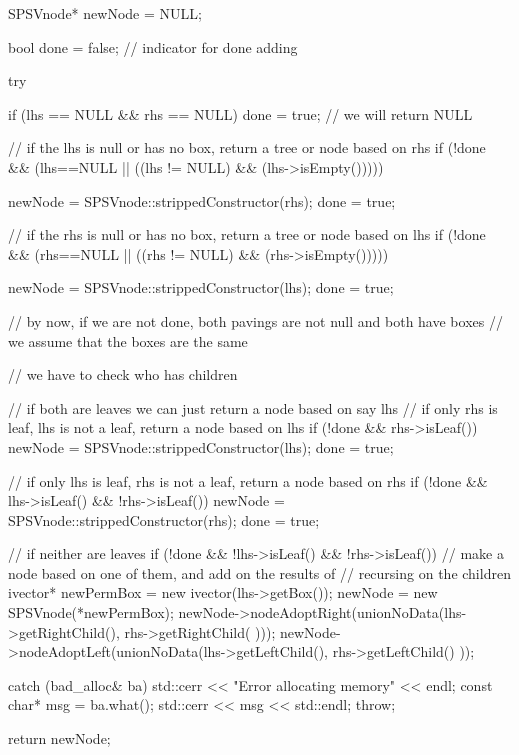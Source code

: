 \begin{DoxyCode}
    {
        SPSVnode* newNode = NULL;

        bool done = false;  // indicator for done adding

        try {

            if (lhs == NULL && rhs == NULL) done = true; // we will return NULL

            // if the lhs is null or has no box, return a tree or node based on
       rhs
            if (!done && (lhs==NULL || ((lhs != NULL) && (lhs->isEmpty())))) {

                newNode = SPSVnode::strippedConstructor(rhs);
                done = true;
            }

            // if the rhs is null or has no box, return a tree or node based on
       lhs
            if (!done && (rhs==NULL || ((rhs != NULL) && (rhs->isEmpty())))) {

                newNode = SPSVnode::strippedConstructor(lhs);
                done = true;
            }

            // by now, if we are not done, both pavings are not null and both
       have boxes
            // we assume that the boxes are the same

            // we have to check who has children

            // if both are leaves we can just return a node based on say lhs
             // if only rhs is leaf, lhs is not a leaf, return a node based on
       lhs
            if (!done && rhs->isLeaf()) {
                newNode = SPSVnode::strippedConstructor(lhs);
                done = true;
            }

            // if only lhs is leaf, rhs is not a leaf, return a node based on
       rhs
            if (!done && lhs->isLeaf() && !rhs->isLeaf()) {
                newNode = SPSVnode::strippedConstructor(rhs);
                done = true;
            }

            // if neither are leaves
            if (!done && !lhs->isLeaf() && !rhs->isLeaf()) {
                // make a node based on one of them, and add on the results of
                // recursing on the children
                ivector* newPermBox = new ivector(lhs->getBox());
                newNode = new SPSVnode(*newPermBox);
                newNode->nodeAdoptRight(unionNoData(lhs->getRightChild(),
                                                            rhs->getRightChild(
      )));
                newNode->nodeAdoptLeft(unionNoData(lhs->getLeftChild(),
                                                            rhs->getLeftChild()
      ));
            }
        }
        catch (bad_alloc& ba) {
            std::cerr << "Error allocating memory" << endl;
            const char* msg = ba.what();
            std::cerr << msg << std::endl;
            throw;
        }

        return newNode;

    }
\end{DoxyCode}
